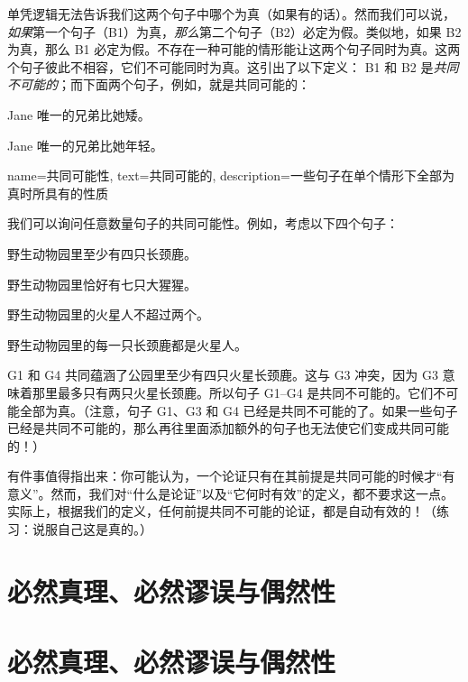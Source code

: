 单凭逻辑无法告诉我们这两个句子中哪个为真（如果有的话）。然而我们可以说，\emph{如果}第一个句子（B1）为真，\emph{那么}第二个句子（B2）必定为假。类似地，如果 B2 为真，那么 B1 必定为假。不存在一种可能的情形能让这两个句子同时为真。这两个句子彼此不相容，它们不可能同时为真。这引出了以下定义：
B1 和 B2 是\emph{共同不可能的}；而下面两个句子，例如，就是共同可能的：


\begin{compactlist}
		\item[B1.] Jane 唯一的兄弟比她矮。
		\item[B2.] Jane 唯一的兄弟比她年轻。
	\end{compactlist}

{
name=共同可能性,
text={共同可能的},
description={一些句子在单个情形下全部为真时所具有的性质}
}

我们可以询问任意数量句子的共同可能性。例如，考虑以下四个句子：


\begin{compactlist}
		\item[G1.] \label{MartianGiraffes} 野生动物园里至少有四只长颈鹿。
		\item[G2.] 野生动物园里恰好有七只大猩猩。
		\item[G3.] 野生动物园里的火星人不超过两个。
		\item[G4.] 野生动物园里的每一只长颈鹿都是火星人。
	\end{compactlist}


G1 和 G4 共同蕴涵了公园里至少有四只火星长颈鹿。这与 G3 冲突，因为 G3 意味着那里最多只有两只火星长颈鹿。所以句子 G1--G4 是共同不可能的。它们不可能全部为真。（注意，句子 G1、G3 和 G4 已经是共同不可能的了。如果一些句子已经是共同不可能的，那么再往里面添加额外的句子也无法使它们变成共同可能的！）

有件事值得指出来：你可能认为，一个论证只有在其前提是共同可能的时候才“有意义”。然而，我们对“什么是论证”以及“它何时有效”的定义，都不要求这一点。实际上，根据我们的定义，任何前提共同不可能的论证，都是自动有效的！（练习：说服自己这是真的。）

\ifHTMLtarget
\section{必然真理、必然谬误与偶然性}
\else
\section[必然真理与必然谬误]{必然真理、必然谬误与偶然性}
\fi

